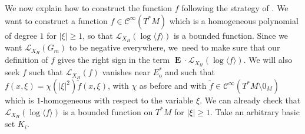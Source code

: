 \documentclass[JEP,XML,SOM,Unicode,NoEqCountersInSection,NoFloatCountersInSection,published]{cedram}
\newcommand{\ro}{\mathrm{o}}
\theoremstyle{definition}
\theoremstyle{plain}
\newcommand{\Ccal}{\mathcal{C}}
\newcommand{\Lie}{\mathcal{L}}
\newcommand{\w}[1]{\langle {#1} \rangle}
\DeclareMathOperator{\E}{\boldsymbol{E}}
\begin{document}
We now explain how to construct the function $f$ following the strategy of \cite{FS,dyatlov-zworski}. We want to construct a function $f \in \Ccal^{\infty} (T^*M)$ which is a homogeneous polynomial of degree $1$ for $|\xi| \geq 1$, so that $\Lie_{X_H} (\log \w{f})$ is a bounded function. Since we want $\Lie_{X_H}(G_m)$ to be negative everywhere, we~need to make sure that our definition of $f$ gives the right sign in the term $\E \cdot\Lie_{X_H}(\log \w{f})$. We will also seek $f$ such that $\Lie_{X_H} (f)$ vanishes near $E_\ro^*$ and such that $f(x,\xi) = \chi (|\xi|^2) \tilde{f} (x,\xi)$, with $\chi$ as before and with $\tilde{f} \in \Ccal^{\infty}(T^* M \setminus 0_M)$ which is $1$-homogeneous with respect to the variable $\xi$. We can already check that $\Lie_{X_H} (\log \w{f})$ is a bounded function on $T^* M$ for $|\xi| \geq 1$. Take an arbitrary basic set $K_i$.
\end{document}
